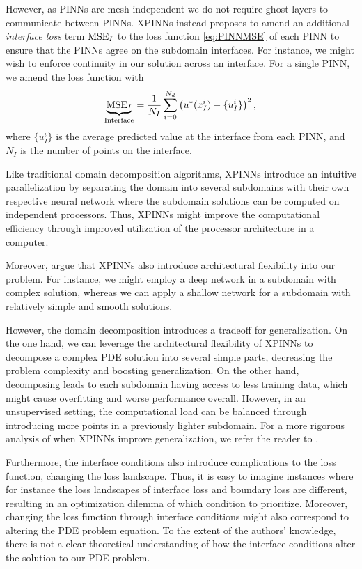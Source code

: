 However, as PINNs are mesh-independent we do not require ghost layers to communicate between PINNs.
XPINNs instead proposes to amend an additional \textit{interface loss} term $\operatorname{MSE}_I$ to the loss function \eqref{eq:PINNMSE} of each PINN to ensure that the PINNs agree on the subdomain interfaces.
For instance, we might wish to enforce continuity in our solution across an interface.
For a single PINN, we amend the loss function with
\begin{equation}\label{eq:MSE_I}
    \underbrace{\operatorname{MSE}_I}_{\text{Interface}} = \frac{1}{N_I} \sum_{i = 0}^{N_d} \left( u^*(x_I^i) - \{u_I^i\} \right)^2,  \\
\end{equation}
where $\{u_I^i\}$ is the average predicted value at the interface from each PINN, and $N_I$ is the number of points on the interface. 

Like traditional domain decomposition algorithms, XPINNs introduce an intuitive parallelization by separating the domain into several subdomains with their own respective neural network where the subdomain solutions can be computed on independent processors.
Thus, XPINNs might improve the computational efficiency through improved utilization of the processor architecture in a computer.

Moreover, \textcite{Jagtap2020ExtendedPN} argue that XPINNs also introduce architectural flexibility into our problem.
For instance, we might employ a deep network in a subdomain with complex solution, whereas we can apply a shallow network for a subdomain with relatively simple and smooth solutions. 

However, the domain decomposition introduces a tradeoff for generalization.
On the one hand, we can leverage the architectural flexibility of XPINNs to decompose a complex PDE solution into several simple parts, decreasing the problem complexity and boosting generalization.
On the other hand, decomposing leads to each subdomain having access to less training data, which might cause overfitting and worse performance overall.
However, in an unsupervised setting, the computational load can be balanced through introducing more points in a previously lighter subdomain.
For a more rigorous analysis of when XPINNs improve generalization, we refer the reader to \cite{XPINN_generalize}.

Furthermore, the interface conditions also introduce complications to the loss function, changing the loss landscape.
Thus, it is easy to imagine instances where for instance the loss landscapes of interface loss and boundary loss are different, resulting in an optimization dilemma of which condition to prioritize.
Moreover, changing the loss function through interface conditions might also correspond to altering the PDE problem equation.
To the extent of the authors' knowledge, there is not a clear theoretical understanding of how the interface conditions alter the solution to our PDE problem. 

